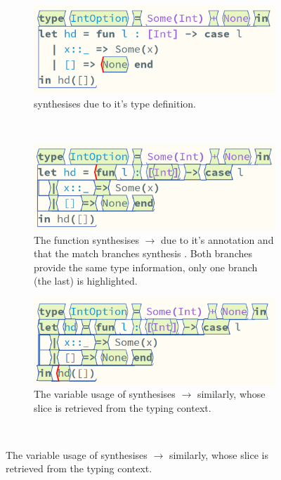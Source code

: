 \begin{figure}[h]
\centering
\begin{subfigure}[t]{0.45\textwidth}
\centering
\includegraphics[width=1\textwidth]{Media/Figures/none_syn}
\caption{ synthesises  due to it's type definition.}
\end{subfigure}$\qquad$
\begin{subfigure}[t]{0.45\textwidth}
\centering
\includegraphics[width=1\textwidth]{Media/Figures/fun_syn}
\caption{The function synthesises \code{[Int]}$\to$  due to it's \code{[Int]} annotation and that the match branches synthesis . Both branches provide the same type information, only one branch (the last) is highlighted.}
\end{subfigure}
\begin{subfigure}[t]{0.45\textwidth}
\centering
\includegraphics[width=1\textwidth]{Media/Figures/hd_syn}
\caption{The variable usage of  synthesises \code{[Int]}$\to$  similarly, whose slice is retrieved from the typing context.}
\end{subfigure}$\qquad$

\end{figure}
